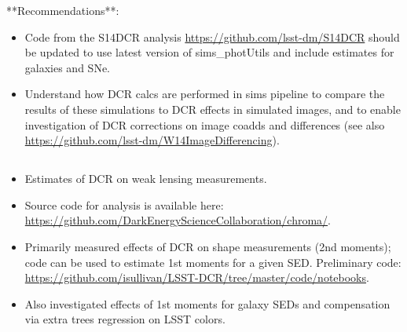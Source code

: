 \documentclass[]{article}
\begin{document}
**Recommendations**:
\begin{itemize}
	\item Code from the S14DCR analysis
          \url{https://github.com/lsst-dm/S14DCR} should be updated to
          use latest version of sims\_photUtils and include estimates
          for galaxies and SNe.
	\item Understand how DCR calcs are performed in sims pipeline
          to compare the results of these simulations to DCR effects
          in simulated images, and to enable investigation of DCR
          corrections on image coadds and differences (see also
          \url{https://github.com/lsst-dm/W14ImageDifferencing}).
\end{itemize}

\subsection{\cite{Meyers2015}}

\begin{itemize}
	\item Estimates of DCR on weak lensing measurements.
	\item Source code for analysis is available here:
          \url{https://github.com/DarkEnergyScienceCollaboration/chroma/}.
	\item Primarily measured effects of DCR on shape measurements
          (2nd moments); code can be used to estimate 1st moments for
          a given SED. Preliminary code:
          \url{https://github.com/isullivan/LSST-DCR/tree/master/code/notebooks}.
        \item Also investigated effects of 1st moments for galaxy SEDs
          and compensation via extra trees regression on LSST colors.
\end{itemize}


\subsection{\cite{Chambers2005}}
\end{document}
